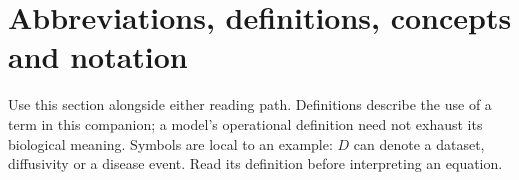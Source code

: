 \clearpage
{}
\section*{Abbreviations, definitions, concepts and notation}\label{sec:syllabus-glossary}
\begingroup
\small
\setlength{\LTpre}{4pt}
\setlength{\LTpost}{5pt}
\renewcommand{\arraystretch}{1.12}
\newenvironment{syllabusdefinitions}{%
  \begin{longtable}{@{}>{\raggedright\arraybackslash}p{.25\linewidth}>{\raggedright\arraybackslash}p{.70\linewidth}@{}}
  \toprule\textbf{Term or symbol} & \textbf{Meaning and how to read it}\\\midrule
  \endhead
}{\bottomrule\end{longtable}}
\newcommand{\glossentry}[2]{\textbf{#1} & #2\\[3pt]}
\newcommand{\syllabusglossarytopic}[1]{\subsection*{#1}\addcontentsline{toc}{subsection}{#1}}

Use this section alongside either reading path. Definitions describe the use of a term in this companion; a model's operational definition need not exhaust its biological meaning. Symbols are local to an example: $D$ can denote a dataset, diffusivity or a disease event. Read its definition before interpreting an equation.

